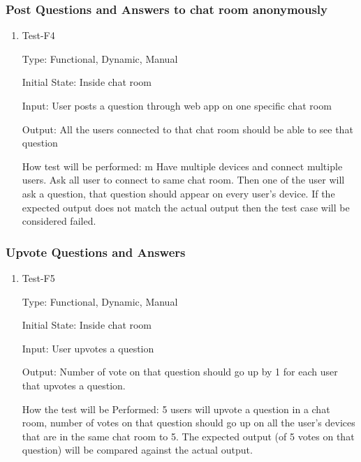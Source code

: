 \documentclass[12pt, titlepage]{article}
\begin{document}
\subsubsection{Post Questions and Answers to chat room anonymously}
		

\begin{enumerate}

\item{Test-F4\\}

Type: Functional, Dynamic, Manual
					
Initial State: Inside chat room
					
Input:  User posts a question through web app on one specific chat room
					
Output: All the users connected to that chat room should be able to see that question

How test will be performed: m Have multiple devices and connect multiple users. Ask all user to connect to same chat room. Then one of the user will ask a question, that question should appear on every user’s device. If the expected output does not match the actual output then the test case will be considered failed. 
					
\end{enumerate}

\subsubsection{Upvote Questions and Answers}
		

\begin{enumerate}

\item{Test-F5\\}

Type: Functional, Dynamic, Manual
	
Initial State: Inside chat room

Input: User upvotes a question

Output: Number of vote on that question should go up by 1 for each user that upvotes a question. 

How the test will be Performed: 5 users will upvote a question in a chat room, number of votes on that question should go up on all the user’s devices that are in the same chat room to 5. The expected output (of 5 votes on that question) will be compared against the actual output.  

\end{enumerate}
\end{document}
